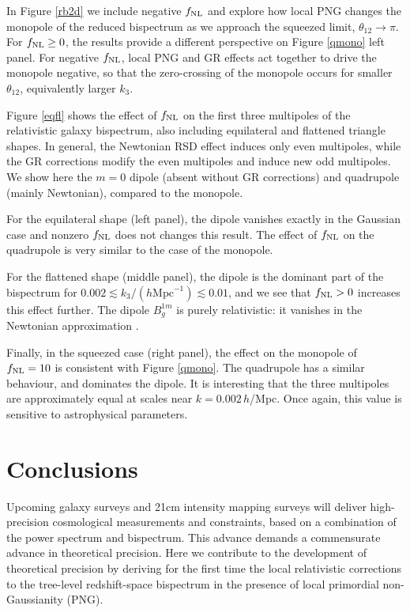 {{{In Figure \ref{rb2d}  we include  negative $f_\text{NL}$ and explore how  local PNG changes the monopole of the reduced bispectrum as we approach the squeezed limit, $\theta_{12}\to\pi$. For $f_\text{NL}\geq0$, the results provide a different perspective on Figure \ref{qmono} left panel. For negative $f_\text{NL}$, local PNG and GR effects act together to drive the monopole negative, so that the zero-crossing of the monopole occurs for smaller $\theta_{12}$, equivalently larger $k_3$. 

Figure \ref{eqfl} shows the effect of $f_\text{NL}$ on
the first three multipoles of the relativistic galaxy bispectrum, also including equilateral and flattened triangle shapes.
 In general, the Newtonian RSD effect induces only even multipoles, while the GR corrections modify the even multipoles and induce new odd multipoles. We show here the $m=0$  dipole (absent without GR corrections) and quadrupole (mainly Newtonian), compared to the monopole. 
 
 For the equilateral shape (left panel), the dipole vanishes exactly in the Gaussian case  \cite{Clarkson:2018dwn,deWeerd:2019cae} and nonzero $f_\text{NL}$ does not changes this result. The effect of $f_\text{NL}$ on the quadrupole is very similar to the case of the monopole. 
 
 For the flattened shape (middle panel), the dipole is the dominant part of the bispectrum for $0.002 \lesssim k_3/(h {\mathrm{Mpc}}^{-1})\lesssim 0.01$, and we see that $f_\text{NL}>0$ increases this effect further. The dipole $B_g^{1m}$ is purely relativistic: it vanishes in the Newtonian approximation  \cite{Clarkson:2018dwn,Maartens:2019yhx,Jolicoeur:2020eup}. 
 
 Finally, in the squeezed case (right panel), the effect on the monopole of  $f_\text{NL}=10$ is consistent with Figure \ref{qmono}. The quadrupole has a similar behaviour, and dominates the dipole. It is interesting that the three multipoles are approximately equal at scales near $k= 0.002\,h$/Mpc. Once again, this value is sensitive to astrophysical parameters.
%
%
%
\section{Conclusions}\label{sec4}
Upcoming galaxy surveys  and 21cm intensity mapping surveys will deliver high-precision cosmological measurements and constraints, based on a combination of the power spectrum and bispectrum. This advance demands a commensurate advance in theoretical precision. Here we contribute to the development of theoretical precision by deriving for the first time the local relativistic corrections to the tree-level redshift-space bispectrum in the presence of local primordial non-Gaussianity (PNG).

}}}
